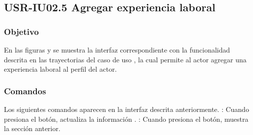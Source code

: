 \clearpage
\subsection{USR-IU02.5 Agregar experiencia laboral}

\subsubsection{Objetivo}
En las figuras  y  se muestra la interfaz correspondiente con la funcionalidad descrita en las
trayectorias del caso de uso  , la cual permite al actor agregar una experiencia laboral al perfil del actor.

\subsubsection{Comandos}
Los siguientes comandos aparecen en la interfaz descrita anteriormente.
\Titem {} : Cuando presiona el botón, actualiza la información .
\Titem {} : Cuando presiona el botón, muestra la sección anterior.%



\clearpage
